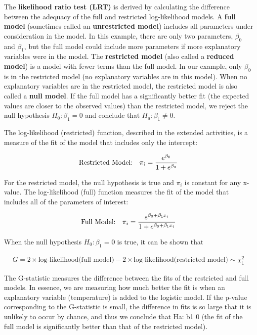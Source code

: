 \documentclass[
]{report}
\begin{document}
The \textbf{likelihood ratio test (LRT)} is derived by calculating the difference between the adequacy of the full and restricted log-likelihood models. A \textbf{full model} (sometimes called an \textbf{unrestricted model}) includes all parameters under consideration in the model. In this example, there are only two parameters, \(\beta_0\) and \(\beta_1\), but the full model could include more parameters if more explanatory variables were in the model. The \textbf{restricted model} (also called a \textbf{reduced model}) is a model with fewer terms than the full model. In our example, only \(\beta_0\) is in the restricted model (no explanatory variables are in this model). When no explanatory variables are in the restricted model, the restricted model is also called a \textbf{null model}. If the full model has a significantly better fit (the expected values are closer to the observed values) than the restricted model, we reject the null hypothesis \(H_0: \beta_1 = 0\) and conclude that \(H_a: \beta_1 \neq 0\).

The log-likelihood (restricted) function, described in the extended activities, is a measure of the fit of the model that includes only the intercept:

\begin{align}
\text{Restricted Model:} \quad \pi_i = \frac{e^{\beta_0}}{1 + e^{\beta_0}}
\notag
\end{align}

For the restricted model, the null hypothesis is true and \(\pi_i\) is constant for any x-value. The log-likelihood (full) function measures the fit of the model that includes all of the parameters of interest:

\begin{align}
\text{Full Model:} \quad \pi_i = \frac{e^{\beta_0 + \beta_1 x_i}}{1 + e^{\beta_0 + \beta_1 x_i}}
\notag
\end{align}

When the null hypothesis \(H_0: \beta_1 = 0\) is true, it can be shown that

\begin{align}
G = 2 \times \text{log-likelihood(full model)} - 2 \times \text{log-likelihood(restricted model)} \sim \chi^2_1 
\tag{7.15}
\end{align}

The G-statistic measures the difference between the fits of the restricted and full models. In essence, we
are measuring how much better the fit is when an explanatory variable (temperature) is added to the logistic
model. If the p-value corresponding to the G-statistic is small, the difference in fits is so large that it is unlikely
to occur by chance, and thus we conclude that Ha: b1 0 (the fit of the full model is significantly better than
that of the restricted model).
\end{document}
